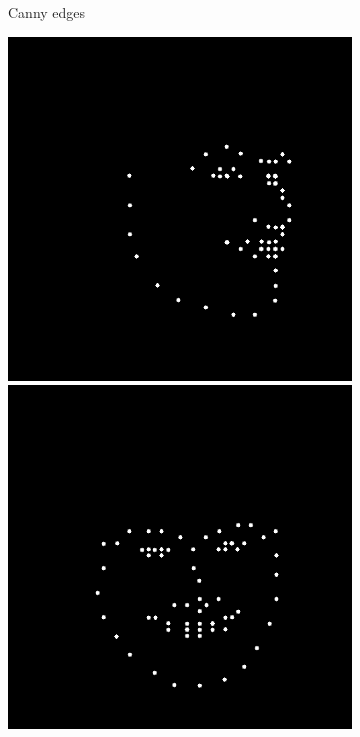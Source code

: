 \begin{figure}[ht]
\begin{subfigure}{0.18\linewidth}
		\caption{Canny edges}
	\end{subfigure}
    \begin{subfigure}{0.18\linewidth}
        \includegraphics[width=\textwidth]{Figures/failed/controlnet/openpose/0-4-5-1-5648_230239_266_openpose.png}
        \includegraphics[width=\textwidth]{Figures/failed/controlnet/openpose/0-2-4-2-293_210300_829_openpose.png}

\end{subfigure}
\end{figure}
